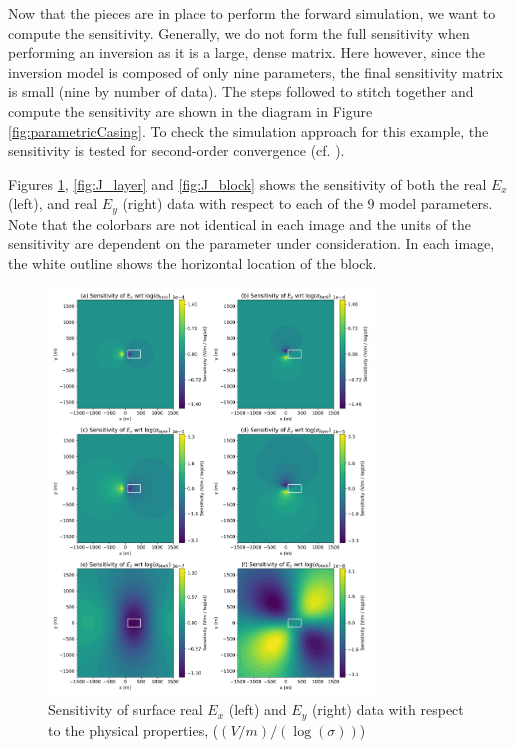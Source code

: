 \documentclass[preprint,review,3p,times,onecolumn,authoryear]{elsarticle}
\begin{document}
Now that the pieces are in place to perform the forward simulation, we want to
compute the sensitivity. Generally, we do not form the full sensitivity when
performing an inversion as it is a large, dense matrix. Here however, since
the inversion model is composed of only nine parameters, the final sensitivity
matrix is small (nine by number of data). The steps followed to stitch together
and compute the sensitivity are shown in the diagram in Figure
\ref{fig:parametricCasing}. To check the simulation approach for this example,
the sensitivity is tested for second-order convergence (cf.
\cite{Haber2014a}).

Figures \ref{fig:J_sigmas}, \ref{fig:J_layer} and \ref{fig:J_block} shows the
sensitivity of both the real $E_x $(left), and real $E_y$ (right) data with
respect to each of the 9 model parameters. Note that the colorbars are not
identical in each image and the units of the sensitivity are dependent on the
parameter under consideration. In each image, the white outline shows the
horizontal location of the block.

{%
\begin{figure}[htb!]
    \centering
    \includegraphics[width=0.77\textwidth]{images/J_sigmas.png}
\caption{Sensitivity of surface real $E_x$ (left) and $E_y$ (right) data with respect to the physical properties, ($(V / m) / (\log(\sigma))$)}
\label{fig:J_sigmas}
\end{figure}
}
\end{document}
